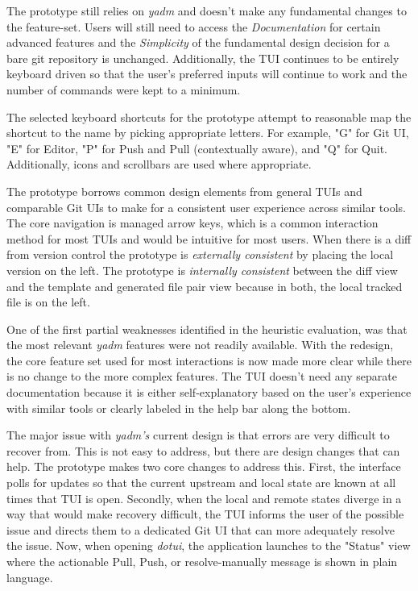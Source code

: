 \documentclass[letterpaper]{jdf}
\begin{document}
 The prototype still relies on \emph{yadm} and doesn't make any fundamental changes to the feature-set. Users will still need to access the \emph{Documentation} for certain advanced features and the \emph{Simplicity} of the fundamental design decision for a bare git repository is unchanged. Additionally, the TUI continues to be entirely keyboard driven so that the user's preferred inputs will continue to work and the number of commands were kept to a minimum.

 The selected keyboard shortcuts for the prototype attempt to reasonable map the shortcut to the name by picking appropriate letters. For example, "G" for Git UI, "E" for Editor, "P" for Push and Pull (contextually aware), and "Q" for Quit. Additionally, icons and scrollbars are used where appropriate.

 The prototype borrows common design elements from general TUIs and comparable Git UIs to make for a consistent user experience across similar tools. The core navigation is managed arrow keys, which is a common interaction method for most TUIs and would be intuitive for most users. When there is a diff from version control the prototype is \emph{externally consistent} by placing the local version on the left. The prototype is \emph{internally consistent} between the diff view and the template and generated file pair view because in both, the local tracked file is on the left.

 One of the first partial weaknesses identified in the heuristic evaluation, was that the most relevant \emph{yadm} features were not readily available. With the redesign, the core feature set used for most interactions is now made more clear while there is no change to the more complex features. The TUI doesn't need any separate documentation because it is either self-explanatory based on the user's experience with similar tools or clearly labeled in the help bar along the bottom.

 The major issue with \emph{yadm's} current design is that errors are very difficult to recover from. This is not easy to address, but there are design changes that can help. The prototype makes two core changes to address this. First, the interface polls for updates so that the current upstream and local state are known at all times that TUI is open. Secondly, when the local and remote states diverge in a way that would make recovery difficult, the TUI informs the user of the possible issue and directs them to a dedicated Git UI that can more adequately resolve the issue. Now, when opening \emph{dotui}, the application launches to the "Status" view where the actionable Pull, Push, or resolve-manually message is shown in plain language.
\end{document}
